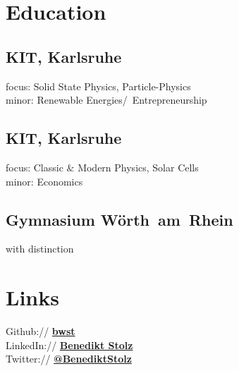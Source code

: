 \documentclass[]{deedy-resume-openfont}
\begin{document}
%
%
\lastupdated

%
%

%
%

\begin{minipage}[t]{0.33\textwidth} 


\section{Education} 

\subsection{KIT, Karlsruhe}
focus: Solid State Physics, Particle-Physics\\
minor: Renewable Energies/~Entrepreneurship\\
\sectionsep

\subsection{KIT, Karlsruhe}
focus: Classic $\&$ Modern Physics, Solar Cells\\
minor: Economics\\
\sectionsep

\subsection{Gymnasium Wörth~am~Rhein}
with distinction
\sectionsep


\section{Links} 
Github:// \href{https://github.com/bwst}{\bf bwst} \\
LinkedIn:// \href{https://www.linkedin.com/in/benediktstolz}{\bf Benedikt Stolz} \\
Twitter:// \href{https://twitter.com/BenediktStolz}{\bf @BenediktStolz}
\sectionsep


\end{minipage}
\end{document}
